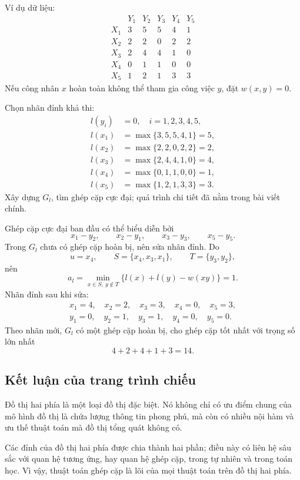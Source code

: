 \documentclass[11pt]{article}
\begin{document}
Ví dụ dữ liệu:
\[
\begin{array}{c|ccccc}
 & Y_1 & Y_2 & Y_3 & Y_4 & Y_5\\ \hline
X_1 & 3 & 5 & 5 & 4 & 1\\
X_2 & 2 & 2 & 0 & 2 & 2\\
X_3 & 2 & 4 & 4 & 1 & 0\\
X_4 & 0 & 1 & 1 & 0 & 0\\
X_5 & 1 & 2 & 1 & 3 & 3
\end{array}
\]
Nếu công nhân \(x\) hoàn toàn không thể tham gia công việc \(y\), đặt
\(w(x,y)=0\).

Chọn nhãn đỉnh khả thi:
\[
\begin{aligned}
l(y_i)&=0,\quad i=1,2,3,4,5,\\
l(x_1)&=\max\{3,5,5,4,1\}=5,\\
l(x_2)&=\max\{2,2,0,2,2\}=2,\\
l(x_3)&=\max\{2,4,4,1,0\}=4,\\
l(x_4)&=\max\{0,1,1,0,0\}=1,\\
l(x_5)&=\max\{1,2,1,3,3\}=3.
\end{aligned}
\]
Xây dựng \(G_l\), tìm ghép cặp cực đại; quá trình chi tiết đã nằm trong bài
viết chính.

Ghép cặp cực đại ban đầu có thể biểu diễn bởi
\[
  x_1-y_2,\qquad x_2-y_1,\qquad x_3-y_3,\qquad x_5-y_5.
\]
Trong \(G_l\) chưa có ghép cặp hoàn bị, nên sửa nhãn đỉnh. Do
\[
  u=x_4,\qquad S=\{x_4,x_3,x_1\},\qquad T=\{y_3,y_2\},
\]
nên
\[
  a_l=\min_{x\in S,\ y\notin T}\{l(x)+l(y)-w(xy)\}=1.
\]
Nhãn đỉnh sau khi sửa:
\[
\begin{gathered}
x_1=4,\quad x_2=2,\quad x_3=3,\quad x_4=0,\quad x_5=3,\\
y_1=0,\quad y_2=1,\quad y_3=1,\quad y_4=0,\quad y_5=0.
\end{gathered}
\]
Theo nhãn mới, \(G_l\) có một ghép cặp hoàn bị, cho ghép cặp tốt nhất với
trọng số lớn nhất
\[
  4+2+4+1+3=14.
\]

\subsection*{Kết luận của trang trình chiếu}

Đồ thị hai phía là một loại đồ thị đặc biệt. Nó không chỉ có ưu điểm chung
của mô hình đồ thị là chứa lượng thông tin phong phú, mà còn có nhiều nội hàm
và ưu thế thuật toán mà đồ thị tổng quát không có.

Các đỉnh của đồ thị hai phía được chia thành hai phần; điều này có liên hệ
sâu sắc với quan hệ tương ứng, hay quan hệ ghép cặp, trong tự nhiên và trong
toán học. Vì vậy, thuật toán ghép cặp là lõi của mọi thuật toán trên đồ thị
hai phía.
\end{document}
